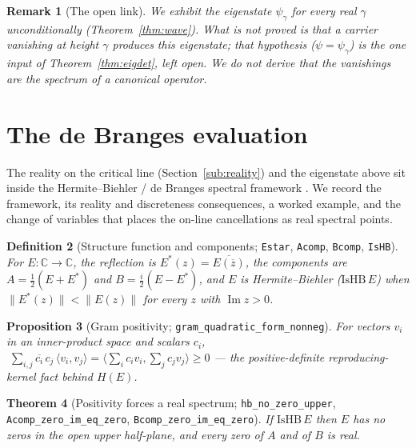 \documentclass[11pt]{article}
\newtheorem{definition}{Definition}[section]
\newtheorem{theorem}[definition]{Theorem}
\newtheorem{proposition}[definition]{Proposition}
\newtheorem{remark}[definition]{Remark}
\DeclareMathOperator{\Imm}{Im}
\newcommand{\C}{\mathbb{C}}
\newcommand{\conj}[1]{\overline{#1}}
\newcommand{\code}[1]{\texttt{#1}}
\begin{document}
\begin{remark}[The open link]\label{rem:openlink}
We exhibit the eigenstate $\psi_\gamma$ for every real $\gamma$ unconditionally
(Theorem~\ref{thm:wave}). What is \emph{not} proved is that a carrier vanishing at height $\gamma$
\emph{produces} this eigenstate; that hypothesis ($\psi=\psi_\gamma$) is the one input of
Theorem~\ref{thm:eigdet}, left open. We do not derive that the vanishings are the spectrum of a
canonical operator.
\end{remark}

\section{The de Branges evaluation}\label{sec:debranges}

The reality on the critical line (Section~\ref{sub:reality}) and the eigenstate above sit inside the
Hermite--Biehler / de Branges spectral framework \cite{Levin1980,deBranges1968}. We record the framework, its reality and
discreteness consequences, a worked example, and the change of variables that places the on-line
cancellations as real spectral points.

\begin{definition}[Structure function and components; \code{Estar}, \code{Acomp}, \code{Bcomp}, \code{IsHB}]\label{def:hb}
For $E:\C\to\C$, the reflection is $E^*(z)=\conj{E(\conj z)}$, the components are
$A=\tfrac12(E+E^*)$ and $B=\tfrac{i}{2}(E-E^*)$, and $E$ is \emph{Hermite--Biehler} ($\mathrm{IsHB}\,E$)
when $\|E^*(z)\|<\|E(z)\|$ for every $z$ with $\Imm z>0$.
\end{definition}

\begin{proposition}[Gram positivity; \code{gram\_quadratic\_form\_nonneg}]\label{prop:gram}
For vectors $v_i$ in an inner-product space and scalars $c_i$,
$\;\sum_{i,j}\conj{c_i}\,c_j\,\langle v_i,v_j\rangle=\big\langle\sum_i c_i v_i,\sum_j c_j v_j\big\rangle\ge0$
--- the positive-definite reproducing-kernel fact behind $H(E)$.
\end{proposition}

\begin{theorem}[Positivity forces a real spectrum; \code{hb\_no\_zero\_upper}, \code{Acomp\_zero\_im\_eq\_zero}, \code{Bcomp\_zero\_im\_eq\_zero}]\label{thm:hbreal}
If $\mathrm{IsHB}\,E$ then $E$ has no zeros in the open upper half-plane, and every zero of $A$ and of
$B$ is real.
\end{theorem}
\end{document}
